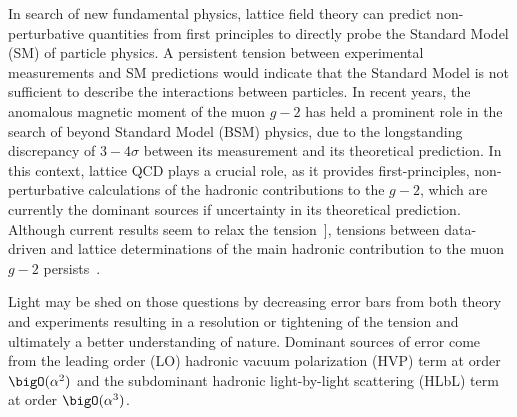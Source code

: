 In search of new fundamental physics, lattice field theory
can predict non-perturbative quantities from first principles
to directly probe the Standard Model (SM) of particle physics.
A persistent tension between experimental measurements and SM predictions would indicate that the Standard Model is not sufficient to describe the interactions between particles.
In recent years, the anomalous magnetic moment of the muon $g-2$ has held a prominent role in the search of beyond Standard Model (BSM) physics, due to the longstanding discrepancy of $3-4\sigma$ \cite{snowmass:2020} between its measurement and its theoretical prediction.
In this context, lattice QCD plays a crucial role, as it provides first-principles, non-perturbative calculations of the hadronic contributions to the $g-2$, which are currently the dominant sources if uncertainty in its theoretical prediction.
Although current results seem to relax the tension~\cite{Muong-2:2025xyk,snowmass:2025}], tensions between data-driven and lattice determinations of the main hadronic contribution to the muon $g-2$ persists~\cite{snowmass:2025}.


Light may be shed on those questions by decreasing error bars from both theory and experiments resulting in a resolution or tightening of the tension and ultimately a better understanding of nature.
Dominant sources of error come from the leading order (LO) hadronic vacuum polarization (HVP) term at order $\bigO(\alpha^{2})$ and the subdominant hadronic light-by-light scattering (HLbL) term at order $\bigO(\alpha^{3})$.

